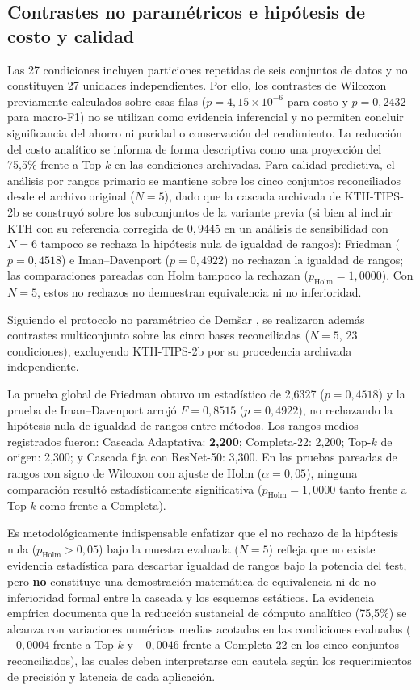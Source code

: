 \subsection{Contrastes no paramétricos e hipótesis de costo y calidad}

Las 27 condiciones incluyen particiones repetidas de seis conjuntos de datos y no constituyen 27 unidades independientes. Por ello, los contrastes de Wilcoxon previamente calculados sobre esas filas ($p=4{,}15\times10^{-6}$ para costo y $p=0{,}2432$ para macro-F1) no se utilizan como evidencia inferencial y no permiten concluir significancia del ahorro ni paridad o conservación del rendimiento. La reducción del costo analítico se informa de forma descriptiva como una proyección del 75{,}5\% frente a Top-$k$ en las condiciones archivadas. Para calidad predictiva, el análisis por rangos primario se mantiene sobre los cinco conjuntos reconciliados desde el archivo original ($N=5$), dado que la cascada archivada de KTH-TIPS-2b se construyó sobre los subconjuntos de la variante previa (si bien al incluir KTH con su referencia corregida de $0{,}9445$ en un análisis de sensibilidad con $N=6$ tampoco se rechaza la hipótesis nula de igualdad de rangos): Friedman ($p=0{,}4518$) e Iman--Davenport ($p=0{,}4922$) no rechazan la igualdad de rangos; las comparaciones pareadas con Holm tampoco la rechazan ($p_{\text{Holm}}=1{,}0000$). Con $N=5$, estos no rechazos no demuestran equivalencia ni no inferioridad.

Siguiendo el protocolo no paramétrico de Demšar \citep{demsar2006statistical}, se realizaron además contrastes multiconjunto sobre las cinco bases reconciliadas ($N=5$, 23 condiciones), excluyendo KTH-TIPS-2b por su procedencia archivada independiente.

La prueba global de Friedman obtuvo un estadístico de 2{,}6327 ($p = 0{,}4518$) y la prueba de Iman--Davenport arrojó $F = 0{,}8515$ ($p = 0{,}4922$), no rechazando la hipótesis nula de igualdad de rangos entre métodos. Los rangos medios registrados fueron: Cascada Adaptativa: \textbf{2{,}200}; Completa-22: 2{,}200; Top-$k$ de origen: 2{,}300; y Cascada fija con ResNet-50: 3{,}300. En las pruebas pareadas de rangos con signo de Wilcoxon con ajuste de Holm ($\alpha = 0{,}05$), ninguna comparación resultó estadísticamente significativa ($p_{\text{Holm}} = 1{,}0000$ tanto frente a Top-$k$ como frente a Completa). 

Es metodológicamente indispensable enfatizar que el no rechazo de la hipótesis nula ($p_{\text{Holm}} > 0{,}05$) bajo la muestra evaluada ($N=5$) refleja que no existe evidencia estadística para descartar igualdad de rangos bajo la potencia del test, pero \textbf{no} constituye una demostración matemática de equivalencia ni de no inferioridad formal entre la cascada y los esquemas estáticos. La evidencia empírica documenta que la reducción sustancial de cómputo analítico (75{,}5\%) se alcanza con variaciones numéricas medias acotadas en las condiciones evaluadas ($-0{,}0004$ frente a Top-$k$ y $-0{,}0046$ frente a Completa-22 en los cinco conjuntos reconciliados), las cuales deben interpretarse con cautela según los requerimientos de precisión y latencia de cada aplicación.

